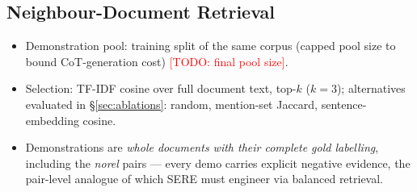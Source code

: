 \documentclass[11pt]{article}
\newcommand{\todo}[1]{\textcolor{red}{[TODO: #1]}}
\begin{document}
\subsection{Neighbour-Document Retrieval}
\label{sec:retrieval}
\begin{itemize}
  \item Demonstration pool: training split of the same corpus (capped pool
        size to bound CoT-generation cost) \todo{final pool size}.
  \item Selection: TF-IDF cosine over full document text, top-$k$ ($k=3$);
        alternatives evaluated in \S\ref{sec:ablations}: random, mention-set
        Jaccard, sentence-embedding cosine.
  \item Demonstrations are \emph{whole documents with their complete gold
        labelling}, including the \textit{norel} pairs --- every demo carries
        explicit negative evidence, the pair-level analogue of which SERE must
        engineer via balanced retrieval.
\end{itemize}
\end{document}
